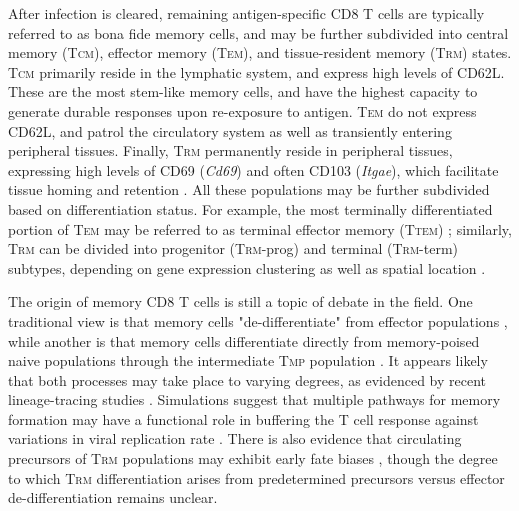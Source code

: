 After infection is cleared, remaining antigen-specific CD8 T cells are typically referred to as bona fide memory cells, and may be further subdivided into central memory (T\textsc{cm}), effector memory (T\textsc{em}), and tissue-resident memory (T\textsc{rm}) states. T\textsc{cm} primarily reside in the lymphatic system, and express high levels of CD62L. These are the most stem-like memory cells, and have the highest capacity to generate durable responses upon re-exposure to antigen. T\textsc{em} do not express CD62L, and patrol the circulatory system as well as transiently entering peripheral tissues. Finally, T\textsc{rm} permanently reside in peripheral tissues, expressing high levels of CD69 (\textit{Cd69}) and often CD103 (\textit{Itgae}), which facilitate tissue homing and retention \citep{jamesonNamingMemoryTCell2021, jamesonUnderstandingSubsetDiversity2018, muellerMemoryCellSubsets2013, parkEmergingRoleResident2015}. All these populations may be further subdivided based on differentiation status. For example, the most terminally differentiated portion of T\textsc{em} may be referred to as terminal effector memory (T\textsc{tem}) \citep{milnerDelineationMolecularlyDistinct2020}; similarly, T\textsc{rm} can be divided into progenitor (T\textsc{rm}-prog) and terminal (T\textsc{rm}-term) subtypes, depending on gene expression clustering as well as spatial location \citep{kurdEarlyPrecursorsMolecular2020, reina-camposTissueresidentMemoryCD82025}.

The origin of memory CD8 T cells is still a topic of debate in the field. One traditional view is that memory cells "de-differentiate" from effector populations \citep{youngbloodEffectorCD8Cells2017, zhouDifferentiationPersistenceMemory2010}, while another is that memory cells differentiate directly from memory-poised naive populations through the intermediate T\textsc{mp} population \citep{ferreiraCentralMemoryCD82020}. It appears likely that both processes may take place to varying degrees, as evidenced by recent lineage-tracing studies \citep{moldDivergentClonalDifferentiation2021, herndler-brandstetterKLRG1EffectorCD82018, abdullahHierarchalSinglecellLineage2024}. Simulations suggest that multiple pathways for memory formation may have a functional role in buffering the T cell response against variations in viral replication rate \citep{abadieReversibleTunableEpigenetic2024}. There is also evidence that circulating precursors of T\textsc{rm} populations may exhibit early fate biases \citep{kokCommittedTissueresidentMemory2020}, though the degree to which T\textsc{rm} differentiation arises from predetermined precursors versus effector de-differentiation remains unclear.

